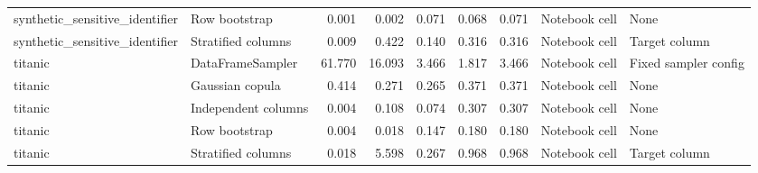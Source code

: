 \begin{table}
\begin{adjustbox}{max width=\textwidth}
\begin{tabular}{llrrrrrll}
synthetic\_sensitive\_identifier & Row bootstrap & 0.001 & 0.002 & 0.071 & 0.068 & 0.071 & Notebook cell & None \\
synthetic\_sensitive\_identifier & Stratified columns & 0.009 & 0.422 & 0.140 & 0.316 & 0.316 & Notebook cell & Target column \\
titanic & DataFrameSampler & 61.770 & 16.093 & 3.466 & 1.817 & 3.466 & Notebook cell & Fixed sampler config \\
titanic & Gaussian copula & 0.414 & 0.271 & 0.265 & 0.371 & 0.371 & Notebook cell & None \\
titanic & Independent columns & 0.004 & 0.108 & 0.074 & 0.307 & 0.307 & Notebook cell & None \\
titanic & Row bootstrap & 0.004 & 0.018 & 0.147 & 0.180 & 0.180 & Notebook cell & None \\
titanic & Stratified columns & 0.018 & 5.598 & 0.267 & 0.968 & 0.968 & Notebook cell & Target column \\
\bottomrule
\end{tabular}
\end{adjustbox}
\end{table}
